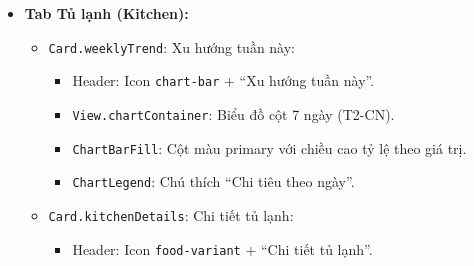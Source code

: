 \begin{itemize}
\begin{itemize}
\begin{itemize}
                    \item Card ``Hết hạn'': Icon \texttt{close-circle}, nền \texttt{errorLight}.
                    \item Card ``Lãng phí'': Icon \texttt{currency-usd}, nền \texttt{secondaryContainer}.
                \end{itemize}
            \item \texttt{Card.categoryDistribution}: Phân loại thực phẩm:
                \begin{itemize}
                    \item Header: Icon \texttt{chart-pie} + ``Phân loại thực phẩm''.
                    \item Danh sách \texttt{CategoryItem}: Dot màu + Tên danh mục + Số lượng + \texttt{ProgressBar}.
                \end{itemize}
            \item \texttt{Card.topItems}: Thực phẩm phổ biến:
                \begin{itemize}
                    \item Header: Icon \texttt{star} + ``Thực phẩm phổ biến''.
                    \item Danh sách \texttt{TopItem}: Rank badge + Tên + Category + Số lần.
                \end{itemize}
        \end{itemize}
    \item \textbf{Tab Tủ lạnh (Kitchen):}
        \begin{itemize}
            \item \texttt{Card.weeklyTrend}: Xu hướng tuần này:
                \begin{itemize}
                    \item Header: Icon \texttt{chart-bar} + ``Xu hướng tuần này''.
                    \item \texttt{View.chartContainer}: Biểu đồ cột 7 ngày (T2-CN).
                    \item \texttt{ChartBarFill}: Cột màu primary với chiều cao tỷ lệ theo giá trị.
                    \item \texttt{ChartLegend}: Chú thích ``Chi tiêu theo ngày''.
                \end{itemize}
            \item \texttt{Card.kitchenDetails}: Chi tiết tủ lạnh:
                \begin{itemize}
                    \item Header: Icon \texttt{food-variant} + ``Chi tiết tủ lạnh''.

\end{itemize}
\end{itemize}
\end{itemize}
